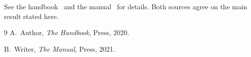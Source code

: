\documentclass{article}
\begin{document}
See the handbook~\cite{handbook} and the manual~\cite{manual} for details.
Both sources agree on the main result stated here.
\begin{thebibliography}{9}
 A.~Author, \textit{The Handbook}, Press, 2020.

 B.~Writer, \textit{The Manual}, Press, 2021.


\end{thebibliography}
\end{document}
